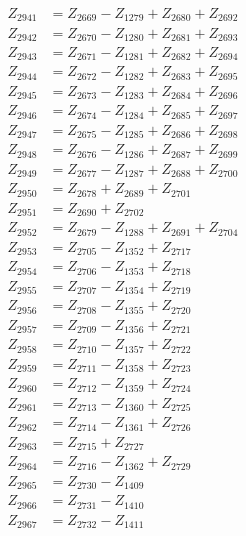 \begin{multicols}{2}
\begin{align}
Z_{2941} &= Z_{2669} - Z_{1279} + Z_{2680} + Z_{2692} \nonumber \\
Z_{2942} &= Z_{2670} - Z_{1280} + Z_{2681} + Z_{2693} \nonumber \\
Z_{2943} &= Z_{2671} - Z_{1281} + Z_{2682} + Z_{2694} \nonumber \\
Z_{2944} &= Z_{2672} - Z_{1282} + Z_{2683} + Z_{2695} \nonumber \\
Z_{2945} &= Z_{2673} - Z_{1283} + Z_{2684} + Z_{2696} \nonumber \\
Z_{2946} &= Z_{2674} - Z_{1284} + Z_{2685} + Z_{2697} \nonumber \\
Z_{2947} &= Z_{2675} - Z_{1285} + Z_{2686} + Z_{2698} \nonumber \\
Z_{2948} &= Z_{2676} - Z_{1286} + Z_{2687} + Z_{2699} \nonumber \\
Z_{2949} &= Z_{2677} - Z_{1287} + Z_{2688} + Z_{2700} \nonumber \\
Z_{2950} &= Z_{2678} + Z_{2689} + Z_{2701} \nonumber \\
Z_{2951} &= Z_{2690} + Z_{2702} \nonumber \\
Z_{2952} &= Z_{2679} - Z_{1288} + Z_{2691} + Z_{2704} \nonumber \\
Z_{2953} &= Z_{2705} - Z_{1352} + Z_{2717} \nonumber \\
Z_{2954} &= Z_{2706} - Z_{1353} + Z_{2718} \nonumber \\
Z_{2955} &= Z_{2707} - Z_{1354} + Z_{2719} \nonumber \\
Z_{2956} &= Z_{2708} - Z_{1355} + Z_{2720} \nonumber \\
Z_{2957} &= Z_{2709} - Z_{1356} + Z_{2721} \nonumber \\
Z_{2958} &= Z_{2710} - Z_{1357} + Z_{2722} \nonumber \\
Z_{2959} &= Z_{2711} - Z_{1358} + Z_{2723} \nonumber \\
Z_{2960} &= Z_{2712} - Z_{1359} + Z_{2724} \nonumber \\
Z_{2961} &= Z_{2713} - Z_{1360} + Z_{2725} \nonumber \\
Z_{2962} &= Z_{2714} - Z_{1361} + Z_{2726} \nonumber \\
Z_{2963} &= Z_{2715} + Z_{2727} \nonumber \\
Z_{2964} &= Z_{2716} - Z_{1362} + Z_{2729} \nonumber \\
Z_{2965} &= Z_{2730} - Z_{1409} \nonumber \\
Z_{2966} &= Z_{2731} - Z_{1410} \nonumber \\
Z_{2967} &= Z_{2732} - Z_{1411} \nonumber \\

\end{align}
\end{multicols}
